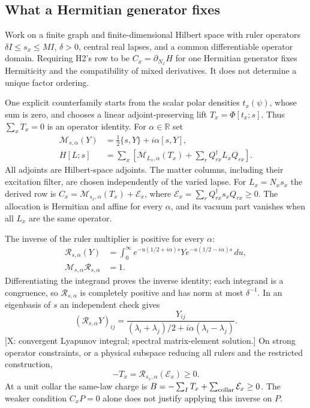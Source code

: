\subsection*{What a Hermitian generator fixes}
Work on a finite graph and finite-dimensional Hilbert space with
ruler operators $\delta I\le s_x\le MI$, $\delta>0$,
central real lapses, and a common
differentiable operator domain.
Requiring H2's row to be $C_x=\partial_{N_x}H$ for one Hermitian
generator fixes Hermiticity and the compatibility of mixed
derivatives.  It does not determine a unique factor ordering.

One explicit counterfamily starts from the scalar polar densities
$t_x(\psi)$, whose sum is zero, and chooses a linear
adjoint-preserving lift $T_x=\Phi[t_x;s]$.
Thus $\sum_xT_x=0$ is an operator identity.
For $\alpha\in\mathbb R$ set
\[
 \begin{aligned}
 \mathcal M_{s,\alpha}(Y)&=\tfrac12\{s,Y\}+i\alpha[s,Y],\\
 H[L;s]&=\sum_x\left[
 \mathcal M_{L_x,\alpha}(T_x)+\sum_rQ_{rx}^\dagger L_xQ_{rx}
 \right].
 \end{aligned}
\]
All adjoints are Hilbert-space adjoints.
The matter columns, including their excitation filter, are chosen
independently of the varied lapse.
For $L_x=N_xs_x$ the derived row is
$C_x=\mathcal M_{s_x,\alpha}(T_x)+\mathcal E_x$, where
$\mathcal E_x=\sum_rQ_{rx}^\dagger s_xQ_{rx}\ge0$.
The allocation is Hermitian and affine for every $\alpha$, and its
vacuum part vanishes when all $L_x$ are the same operator.

The inverse of the ruler multiplier is positive for every $\alpha$:
\[
 \begin{aligned}
 \mathcal R_{s,\alpha}(Y)
 &=\int_0^\infty e^{-u(1/2+i\alpha)s}
       Y e^{-u(1/2-i\alpha)s}\,du,\\
 \mathcal M_{s,\alpha}\mathcal R_{s,\alpha}&=1.
 \end{aligned}
\]
Differentiating the integrand proves the inverse identity; each
integrand is a congruence, so $\mathcal R_{s,\alpha}$ is completely
positive and has norm at most $\delta^{-1}$.
In an eigenbasis of $s$ an independent check gives
\[
 (\mathcal R_{s,\alpha}Y)_{ij}
 =\frac{Y_{ij}}{(\lambda_i+\lambda_j)/2+
                    i\alpha(\lambda_i-\lambda_j)} .
\]
[X: convergent Lyapunov integral; spectral matrix-element solution.]
On strong operator constraints, or a physical subspace reducing all
rulers and the restricted construction,
\[
 -T_x=\mathcal R_{s_x,\alpha}(\mathcal E_x)\ge0.
\]
At a unit collar the same-law charge is
$B=-\sum_I T_x+\sum_{\rm collar}\mathcal E_x\ge0$.
The weaker condition $C_xP=0$ alone does not justify applying this
inverse on $P$.

